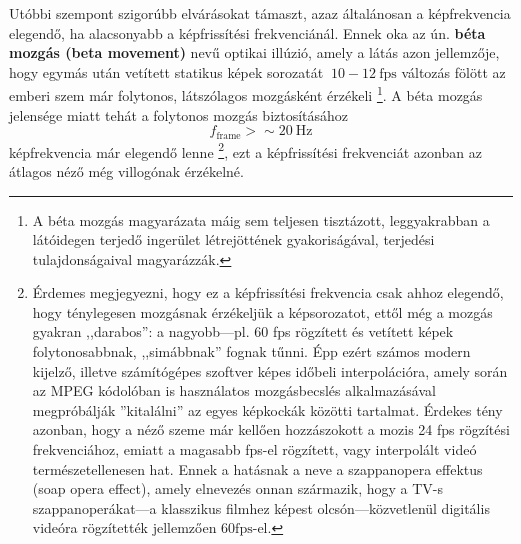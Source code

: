 Utóbbi szempont szigorúbb elvárásokat támaszt, azaz általánosan a képfrekvencia elegendő, ha alacsonyabb a képfrissítési frekvenciánál.
Ennek oka az ún. \textbf{béta mozgás (beta movement)} nevű optikai illúzió, amely a látás azon jellemzője, hogy egymás után vetített statikus képek sorozatát $~10-12~\mathrm{fps}$ változás fölött az emberi szem már folytonos, látszólagos mozgásként érzékeli \footnote{A béta mozgás magyarázata máig sem teljesen tisztázott, leggyakrabban a látóidegen terjedő ingerület létrejöttének gyakoriságával, terjedési tulajdonságaival magyarázzák.}.
A béta mozgás jelensége miatt tehát a folytonos mozgás biztosításához 
\begin{equation}
f_{\mathrm{frame}} > \sim20~\mathrm{Hz} 
\end{equation}
képfrekvencia már elegendő lenne 
\footnote{Érdemes megjegyezni, hogy ez a képfrissítési frekvencia csak ahhoz elegendő, hogy ténylegesen mozgásnak érzékeljük a képsorozatot, ettől még a mozgás gyakran ,,darabos'': a nagyobb---pl. 60 fps rögzített és vetített képek folytonosabbnak, ,,simábbnak'' fognak tűnni. 
Épp ezért számos modern kijelző, illetve számítógépes szoftver képes időbeli interpolációra, amely során az MPEG kódolóban is használatos mozgásbecslés alkalmazásával megpróbálják ''kitalálni'' az egyes képkockák közötti tartalmat.
Érdekes tény azonban, hogy a néző szeme már kellően hozzászokott a mozis 24 fps rögzítési frekvenciához, emiatt a magasabb fps-el rögzített, vagy interpolált videó természetellenesen hat.
Ennek a hatásnak a neve a szappanopera effektus (soap opera effect), amely elnevezés onnan származik, hogy a TV-s szappanoperákat---a klasszikus filmhez képest olcsón---közvetlenül digitális videóra rögzítették jellemzően $60 \mathrm{fps}$-el.},
ezt a képfrissítési frekvenciát azonban az átlagos néző még villogónak érzékelné.

